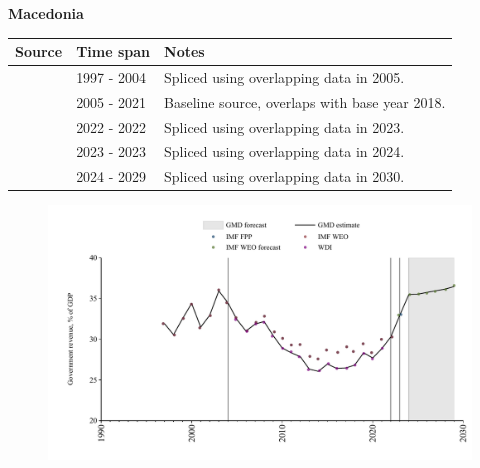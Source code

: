 \documentclass[12pt,a4paper,landscape]{article}
\begin{document}
\begin{adjustbox}{max totalsize={\paperwidth}{\paperheight},center}
\begin{minipage}[t][\textheight][t]{\textwidth}
\vspace*{0.5cm}
{}
\begin{center}
{\Large\bfseries Macedonia}
\end{center}
\vspace{0.5cm}
\begin{table}[H]
\centering
\small
\begin{tabular}{|l|l|l|}
\hline
\textbf{Source} & \textbf{Time span} & \textbf{Notes} \\
\hline
\rowcolor{white}\cite{IMF_WEO}& 1997 - 2004 &Spliced using overlapping data in 2005.\\
\rowcolor{lightgray}\cite{WDI}& 2005 - 2021 &Baseline source, overlaps with base year 2018.\\
\rowcolor{white}\cite{IMF_WEO}& 2022 - 2022 &Spliced using overlapping data in 2023.\\
\rowcolor{lightgray}\cite{IMF_FPP}& 2023 - 2023 &Spliced using overlapping data in 2024.\\
\rowcolor{white}\cite{IMF_WEO_forecast}& 2024 - 2029 &Spliced using overlapping data in 2030.\\
\hline
\end{tabular}
\end{table}
\begin{figure}[H]
\centering
\includegraphics[width=\textwidth,height=0.6\textheight,keepaspectratio]{graphs/MKD_govrev_GDP.pdf}
\end{figure}
\end{minipage}
\end{adjustbox}
\end{document}
